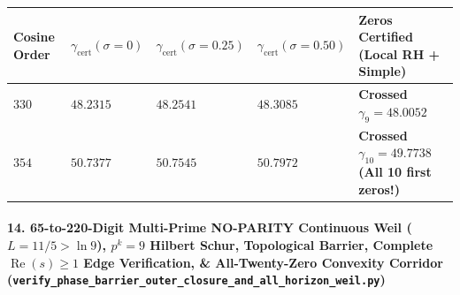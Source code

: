 \documentclass[
  11pt,
]{article}
\newcounter{none} %
\begin{document}
\begin{enumerate}
  {\def\LTcaptype{none} %
  \begin{longtable}[]{@{}
    >{\centering\arraybackslash}p{}
    >{\centering\arraybackslash}p{}
    >{\centering\arraybackslash}p{}
    >{\centering\arraybackslash}p{}
    >{\raggedright\arraybackslash}p{}@{}}
  \toprule\noalign{}
  \begin{minipage}[b]{\linewidth}\centering
  Cosine Order
  \end{minipage} & \begin{minipage}[b]{\linewidth}\centering
  \(\gamma_{\text{cert}}(\sigma = 0)\)
  \end{minipage} & \begin{minipage}[b]{\linewidth}\centering
  \(\gamma_{\text{cert}}(\sigma = 0.25)\)
  \end{minipage} & \begin{minipage}[b]{\linewidth}\centering
  \(\gamma_{\text{cert}}(\sigma = 0.50)\)
  \end{minipage} & \begin{minipage}[b]{\linewidth}\raggedright
  Zeros Certified (Local RH + Simple)
  \end{minipage} \\
  \midrule\noalign{}
  \endhead
  \bottomrule\noalign{}
  \endlastfoot
  \textbf{\(330\)} & \textbf{\(48.2315\)} & \textbf{\(48.2541\)} &
  \textbf{\(48.3085\)} & \textbf{Crossed \(\gamma_9 = 48.0052\)} \\
  \textbf{\(354\)} & \textbf{\(50.7377\)} & \textbf{\(50.7545\)} &
  \textbf{\(50.7972\)} & \textbf{Crossed \(\gamma_{10} = 49.7738\) (All
  10 first zeros!)} \\
  \end{longtable}
  }
\end{enumerate}

\paragraph{\texorpdfstring{14. 65-to-220-Digit Multi-Prime NO-PARITY
Continuous Weil (\(L = 11/5 > \ln 9\)), \(p^k = 9\) Hilbert Schur,
Topological Barrier, Complete \(\operatorname{Re}(s) \ge 1\) Edge
Verification, \& All-Twenty-Zero Convexity Corridor
(\texttt{verify\_phase\_barrier\_outer\_closure\_and\_all\_horizon\_weil.py})}{14. 65-to-220-Digit Multi-Prime NO-PARITY Continuous Weil (L = 11/5 \textgreater{} \textbackslash ln 9), p\^{}k = 9 Hilbert Schur, Topological Barrier, Complete \textbackslash operatorname\{Re\}(s) \textbackslash ge 1 Edge Verification, \& All-Twenty-Zero Convexity Corridor (verify\_phase\_barrier\_outer\_closure\_and\_all\_horizon\_weil.py)}}\label{to-220-digit-multi-prime-no-parity-continuous-weil-l-115-ln-9-pk-9-hilbert-schur-topological-barrier-complete-operatornameres-ge-1-edge-verification-all-twenty-zero-convexity-corridor-verify_phase_barrier_outer_closure_and_all_horizon_weil.py}
\end{document}
